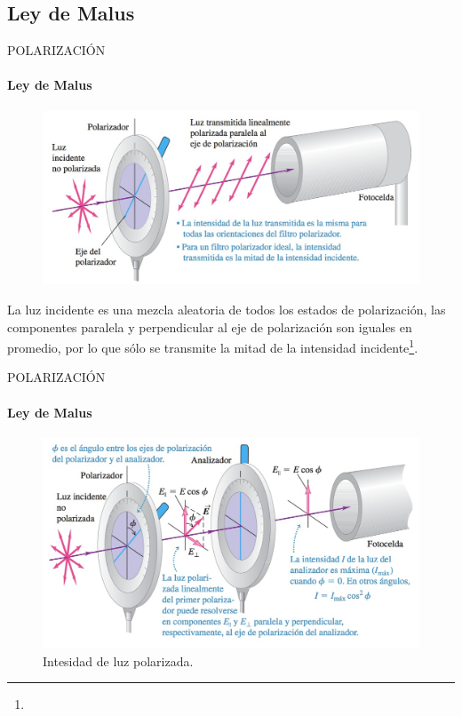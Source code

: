 \subsection{Ley de Malus}
\begin{frame}{POLARIZACIÓN}
    \framesubtitle{Ley de Malus}
    \begin{figure}[H]
        \centering
        \includegraphics[scale=0.25]{mari/m_malus1.jpeg}
    \end{figure}
    La luz incidente es una mezcla aleatoria de todos los estados de polarización, las componentes paralela y perpendicular al eje de polarización son iguales en promedio, por lo que sólo se transmite la mitad de la intensidad incidente\footnote{}.
\end{frame}

\begin{frame}{POLARIZACIÓN}
    \framesubtitle{Ley de Malus}
    \begin{figure}[H]
        \includegraphics[scale=0.25]{mari/m_malus2.jpeg}
        \caption{Intesidad de luz polarizada\footnotemark{}.}
    \end{figure}
\end{frame}


